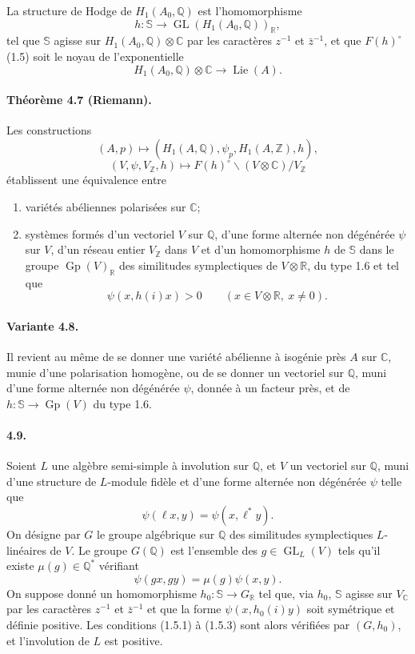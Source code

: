 \documentclass[10pt]{article}
\newcommand{\C}{\mathbb C}
\newcommand{\Q}{\mathbb Q}
\newcommand{\R}{\mathbb R}
\newcommand{\Z}{\mathbb Z}
\newcommand{\bS}{\mathbb S}
\newcommand{\GL}{\operatorname{GL}}
\newcommand{\Gp}{\operatorname{Gp}}
\newcommand{\Lie}{\operatorname{Lie}}
\begin{document}
La structure de Hodge de $H_1(A_0,\Q)$ est l'homomorphisme
\[
h:\bS\longrightarrow \GL(H_1(A_0,\Q))_\R,
\]
tel que $\bS$ agisse sur $H_1(A_0,\Q)\otimes\C$ par les caractères $z^{-1}$ et $\bar z^{-1}$, et que $F(h)^\circ$ (1.5) soit le noyau de l'exponentielle
\[
H_1(A_0,\Q)\otimes\C\longrightarrow\Lie(A).
\]

\paragraph{Théorème 4.7 (Riemann).} Les constructions
\[
(A,p)\longmapsto (H_1(A,\Q),\psi_p,H_1(A,\Z),h),
\]
\[
(V,\psi,V_\Z,h)\longmapsto
F(h)^\circ\backslash (V\otimes\C)/V_\Z
\]
établissent une équivalence entre
\begin{enumerate}[label=(\alph*)]
\item variétés abéliennes polarisées sur $\C$;
\item systèmes formés d'un vectoriel $V$ sur $\Q$, d'une forme alternée non dégénérée $\psi$ sur $V$, d'un réseau entier $V_\Z$ dans $V$ et d'un homomorphisme $h$ de $\bS$ dans le groupe $\Gp(V)_\R$ des similitudes symplectiques de $V\otimes\R$, du type 1.6 et tel que
\[
\psi(x,h(i)x)>0\qquad(x\in V\otimes\R,\ x\ne0).
\]
\end{enumerate}

\paragraph{Variante 4.8.} Il revient au même de se donner une variété abélienne à isogénie près $A$ sur $\C$, munie d'une polarisation homogène, ou de se donner un vectoriel sur $\Q$, muni d'une forme alternée non dégénérée $\psi$, donnée à un facteur près, et de $h:\bS\longrightarrow\Gp(V)$ du type 1.6.

\paragraph{4.9.} Soient $L$ une algèbre semi-simple à involution sur $\Q$, et $V$ un vectoriel sur $\Q$, muni d'une structure de $L$-module fidèle et d'une forme alternée non dégénérée $\psi$ telle que
\[
\tag{4.9.1}
\psi(\ell x,y)=\psi(x,\ell^*y).
\]
On désigne par $G$ le groupe algébrique sur $\Q$ des similitudes symplectiques $L$-linéaires de $V$. Le groupe $G(\Q)$ est l'ensemble des $g\in\GL_L(V)$ tels qu'il existe $\mu(g)\in\Q^*$ vérifiant
\[
\tag{4.9.2}
\psi(gx,gy)=\mu(g)\psi(x,y).
\]
On suppose donné un homomorphisme $h_0:\bS\longrightarrow G_\R$ tel que, via $h_0$, $\bS$ agisse sur $V_\C$ par les caractères $z^{-1}$ et $\bar z^{-1}$ et que la forme $\psi(x,h_0(i)y)$ soit symétrique et définie positive. Les conditions (1.5.1) à (1.5.3) sont alors vérifiées par $(G,h_0)$, et l'involution de $L$ est positive.
\end{document}

